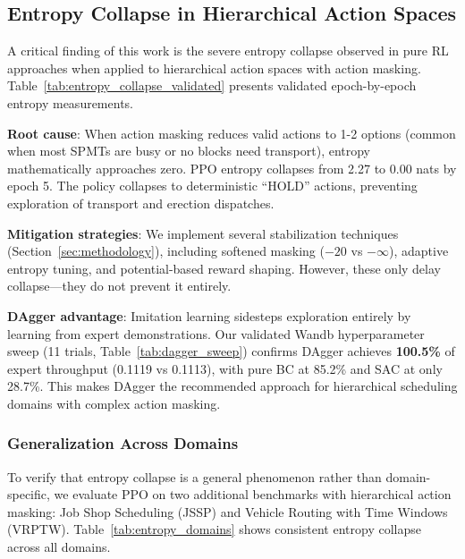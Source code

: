 \documentclass[11pt,a4paper]{article}
\begin{document}
\subsection{Entropy Collapse in Hierarchical Action Spaces}

A critical finding of this work is the severe entropy collapse observed in pure RL approaches when applied to hierarchical action spaces with action masking. Table~\ref{tab:entropy_collapse_validated} presents validated epoch-by-epoch entropy measurements.

\textbf{Root cause}: When action masking reduces valid actions to 1-2 options (common when most SPMTs are busy or no blocks need transport), entropy mathematically approaches zero. PPO entropy collapses from 2.27 to 0.00 nats by epoch 5. The policy collapses to deterministic ``HOLD'' actions, preventing exploration of transport and erection dispatches.

\textbf{Mitigation strategies}: We implement several stabilization techniques (Section~\ref{sec:methodology}), including softened masking ($-20$ vs $-\infty$), adaptive entropy tuning, and potential-based reward shaping. However, these only delay collapse---they do not prevent it entirely.

\textbf{DAgger advantage}: Imitation learning sidesteps exploration entirely by learning from expert demonstrations. Our validated Wandb hyperparameter sweep (11 trials, Table~\ref{tab:dagger_sweep}) confirms DAgger achieves \textbf{100.5\%} of expert throughput (0.1119 vs 0.1113), with pure BC at 85.2\% and SAC at only 28.7\%. This makes DAgger the recommended approach for hierarchical scheduling domains with complex action masking.

\subsubsection{Generalization Across Domains}

To verify that entropy collapse is a general phenomenon rather than domain-specific, we evaluate PPO on two additional benchmarks with hierarchical action masking: Job Shop Scheduling (JSSP) and Vehicle Routing with Time Windows (VRPTW). Table~\ref{tab:entropy_domains} shows consistent entropy collapse across all domains.
\end{document}
